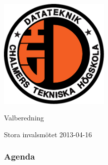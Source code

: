 \documentclass[unicode, handout, 10pt, t,subsection=true]{beamer}
\begin{document}
\begin{frame}[c]
\begin{center}
\includegraphics[width=0.4\textwidth]{dteklogo}
\bigskip
\bfseries

{\LARGE Valberedning}

\smallskip

{\large Stora invalsmötet 2013-04-16}
\end{center}
\end{frame}


\begin{frame}
\frametitle{Agenda}
\small
\tableofcontents
\end{frame}






\end{document}
